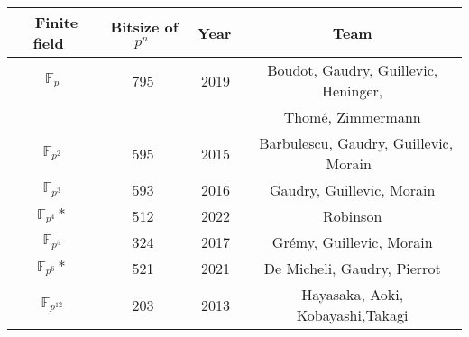 \documentclass[preview]{standalone}
\begin{document}
\begin{center}
\begin{tabular}{|c|c|c|c|}
    \hline
    $ \,$ Finite field $ \,$ &$ \,$Bitsize of $p^n \,$ &$ \,$ Year$ \,$& $ \,$ Team $ \,$\\
    \hline
    $\mathbb{F}_p$ & 795 & 2019 & Boudot, Gaudry, Guillevic, Heninger, \\
    &&&Thom\'{e}, Zimmermann\\ 
    $\mathbb{F}_{p^2}$ &  595 & 2015 & $ \,$ Barbulescu, Gaudry, Guillevic, Morain $\,$ \\ 
    $\mathbb{F}_{p^3}$ & 593 & 2016 & Gaudry, Guillevic, Morain \\ 
    $\mathbb{F}_{p^4}*$ & 512& 2022 & Robinson \\ 
    $\mathbb{F}_{p^5}$ & 324& 2017 & Gr\'{e}my, Guillevic, Morain \\ 
    $\mathbb{F}_{p^6}*$ & 521& 2021 & De Micheli, Gaudry, Pierrot\\
    $\mathbb{F}_{p^{12}}$ & 203& 2013 &Hayasaka, Aoki, Kobayashi,Takagi \\
    \hline
\end{tabular}
\end{center}
\end{document}
